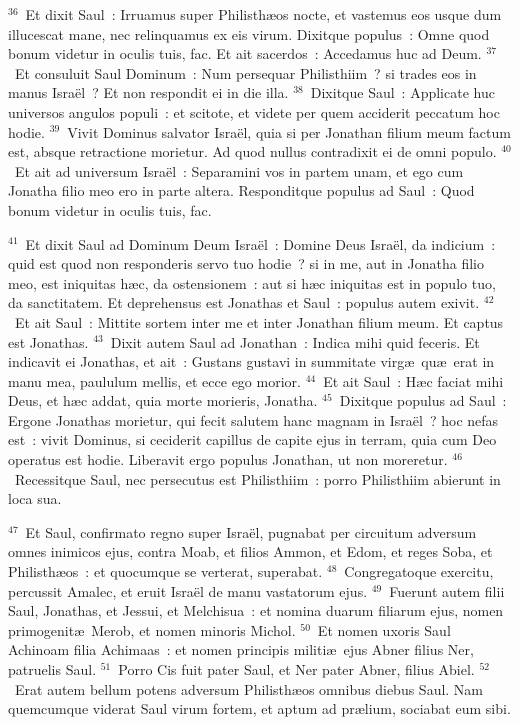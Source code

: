 ${}^{36}$~Et dixit Saul~: Irruamus super Philisth\ae os nocte, et vastemus eos usque dum illucescat mane, nec relinquamus ex eis virum. Dixitque populus~: Omne quod bonum videtur in oculis tuis, fac. Et ait sacerdos~: Accedamus huc ad Deum.
${}^{37}$~Et consuluit Saul Dominum~: Num persequar Philisthiim~? si trades eos in manus Isra\"el~? Et non respondit ei in die illa.
${}^{38}$~Dixitque Saul~: Applicate huc universos angulos populi~: et scitote, et videte per quem acciderit peccatum hoc hodie.
${}^{39}$~Vivit Dominus salvator Isra\"el, quia si per Jonathan filium meum factum est, absque retractione morietur. Ad quod nullus contradixit ei de omni populo.
${}^{40}$~Et ait ad universum Isra\"el~: Separamini vos in partem unam, et ego cum Jonatha filio meo ero in parte altera. Responditque populus ad Saul~: Quod bonum videtur in oculis tuis, fac.


${}^{41}$~Et dixit Saul ad Dominum Deum Isra\"el~: Domine Deus Isra\"el, da indicium~: quid est quod non responderis servo tuo hodie~? si in me, aut in Jonatha filio meo, est iniquitas h\ae c, da ostensionem~: aut si h\ae c iniquitas est in populo tuo, da sanctitatem. Et deprehensus est Jonathas et Saul~: populus autem exivit.
${}^{42}$~Et ait Saul~: Mittite sortem inter me et inter Jonathan filium meum. Et captus est Jonathas.
${}^{43}$~Dixit autem Saul ad Jonathan~: Indica mihi quid feceris. Et indicavit ei Jonathas, et ait~: Gustans gustavi in summitate virg\ae\ qu\ae\ erat in manu mea, paululum mellis, et ecce ego morior.
${}^{44}$~Et ait Saul~: H\ae c faciat mihi Deus, et h\ae c addat, quia morte morieris, Jonatha.
${}^{45}$~Dixitque populus ad Saul~: Ergone Jonathas morietur, qui fecit salutem hanc magnam in Isra\"el~? hoc nefas est~: vivit Dominus, si ceciderit capillus de capite ejus in terram, quia cum Deo operatus est hodie. Liberavit ergo populus Jonathan, ut non moreretur.
${}^{46}$~Recessitque Saul, nec persecutus est Philisthiim~: porro Philisthiim abierunt in loca sua.


${}^{47}$~Et Saul, confirmato regno super Isra\"el, pugnabat per circuitum adversum omnes inimicos ejus, contra Moab, et filios Ammon, et Edom, et reges Soba, et Philisth\ae os~: et quocumque se verterat, superabat.
${}^{48}$~Congregatoque exercitu, percussit Amalec, et eruit Isra\"el de manu vastatorum ejus.
${}^{49}$~Fuerunt autem filii Saul, Jonathas, et Jessui, et Melchisua~: et nomina duarum filiarum ejus, nomen primogenit\ae\ Merob, et nomen minoris Michol.
${}^{50}$~Et nomen uxoris Saul Achinoam filia Achimaas~: et nomen principis militi\ae\ ejus Abner filius Ner, patruelis Saul.
${}^{51}$~Porro Cis fuit pater Saul, et Ner pater Abner, filius Abiel.
${}^{52}$~Erat autem bellum potens adversum Philisth\ae os omnibus diebus Saul. Nam quemcumque viderat Saul virum fortem, et aptum ad pr\ae lium, sociabat eum sibi.

